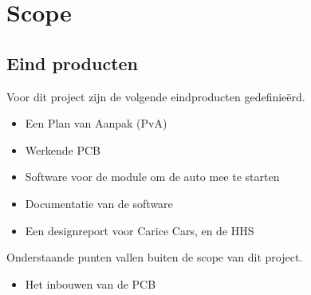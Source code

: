 \section{Scope}

\subsection{Eind producten}
Voor dit project zijn de volgende eindproducten gedefinieërd.
\begin{itemize}
	\item Een Plan van Aanpak (PvA)
	\item Werkende PCB
	\item Software voor de module om de auto mee te starten
	\item Documentatie van de software
	\item Een designreport voor Carice Cars, en de HHS
\end{itemize}

Onderstaande punten vallen buiten de scope van dit project.

\begin{itemize}
	\item Het inbouwen van de PCB
\end{itemize}
